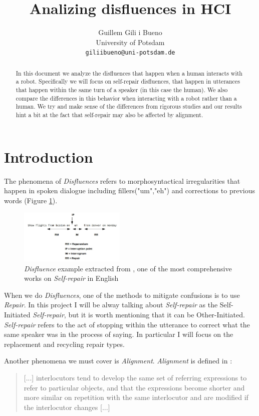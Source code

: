 \documentclass[11pt]{article}
\title{Analizing disfluences in HCI}
\author{Guillem Gili i Bueno\\
	University of Potsdam\\
	\texttt{giliibueno@uni-potsdam.de}}
\begin{document}
	\maketitle
	\begin{abstract}
		In this document we analyze the disfluences that happen when a human interacts with a robot. Specifically we will focus on self-repair disfluences, that happen in utterances that happen within the same turn of a speaker (in this case the human). We also compare the differences in this behavior when interacting with a robot rather than a human. We try and make sense of the differences from rigorous studies and our results hint a bit at the fact that self-repair may also be affected by alignment.
	\end{abstract}

\section{Introduction}

The phenomena of \emph{Disfluences} refers to morphosyntactical irregularities that happen in spoken dialogue including fillers("um","eh")  and corrections to previous words (Figure \ref{fig_disfluence_example}). 
\begin{figure}[h]

\centering
\includegraphics[width=0.45\textwidth]{disfluences_example}
\caption{\emph{Disfluence} example extracted from \cite{shriberg1994preliminaries}, one of the most comprehensive works on \emph{Self-repair} in English}
	\label{fig_disfluence_example}
\end{figure}

When we do \emph{Disfluences}, one of the methods to mitigate confusions is to use \emph{Repair}. In this project I will be alway talking about \emph{Self-repair} as the Self-Initiated \emph{Self-repair}, but it is worth mentioning that it can be Other-Initiated. \emph{Self-repair} refers to the act of stopping within the utterance to correct what the same speaker was in the process of saying. In particular I will focus on the replacement and recycling repair types.


Another phenomena we must cover is \emph{Alignment}. \emph{Alignment} is defined in \cite{pickering_garrod_2004}:
\begin{quote}
[...] interlocutors tend to
develop the same set of referring expressions to refer to
particular objects, and that the expressions become shorter
and more similar on repetition with the same interlocutor
and are modified if the interlocutor changes [...] 
\end{quote}
\end{document}
